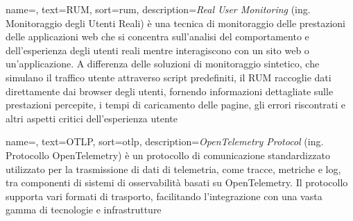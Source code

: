  {
    name=,
    text=RUM,
    sort=rum,
    description={\emph{Real User Monitoring} (ing. Monitoraggio degli Utenti Reali) è una tecnica di monitoraggio delle prestazioni delle applicazioni web che si concentra sull'analisi del comportamento e dell'esperienza degli utenti reali mentre interagiscono con un sito web o un'applicazione. A differenza delle soluzioni di monitoraggio sintetico, che simulano il traffico utente attraverso script predefiniti, il RUM raccoglie dati direttamente dai browser degli utenti, fornendo informazioni dettagliate sulle prestazioni percepite, i tempi di caricamento delle pagine, gli errori riscontrati e altri aspetti critici dell'esperienza utente}
}

 {
    name=,
    text=OTLP,
    sort=otlp,
    description={\emph{OpenTelemetry Protocol} (ing. Protocollo OpenTelemetry) è un protocollo di comunicazione standardizzato utilizzato per la trasmissione di dati di telemetria, come tracce, metriche e log, tra componenti di sistemi di osservabilità basati su OpenTelemetry. Il protocollo supporta vari formati di trasporto, facilitando l'integrazione con una vasta gamma di tecnologie e infrastrutture}
}